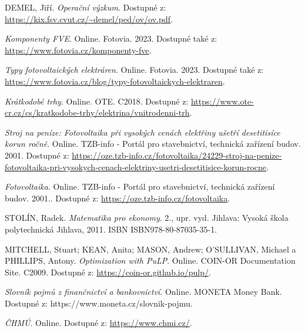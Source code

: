 \begin{thebibliography}{9}
    DEMEL, Jiří. \textit{Operační výzkum}. Dostupné z: \url{https://kix.fsv.cvut.cz/~demel/ped/ov/ov.pdf}.
    
    \textit{Komponenty FVE}. Online. Fotovia. 2023. Dostupné také z: \url{https://www.fotovia.cz/komponenty-fve}.
    
    \textit{Typy fotovoltaických elektráren}. Online. Fotovia. 2023. Dostupné také z: \url{https://www.fotovia.cz/blog/typy-fotovoltaickych-elektraren}.
    
    \textit{Krátkodobé trhy}. Online. OTE. C2018. Dostupné z: \url{https://www.ote-cr.cz/cs/kratkodobe-trhy/elektrina/vnitrodenni-trh}.
    
    \textit{Stroj na peníze: Fotovoltaika při vysokých cenách elektřiny ušetří desetitisíce korun ročně}. Online. TZB-info - Portál pro stavebnictví, technická zařízení budov. 2001. Dostupné z: \url{https://oze.tzb-info.cz/fotovoltaika/24229-stroj-na-penize-fotovoltaika-pri-vysokych-cenach-elektriny-usetri-desetitisice-korun-rocne}.

    \textit{Fotovoltaika}. Online. TZB-info - Portál pro stavebnictví, technická zařízení budov. 2001.. Dostupné z: \url{https://oze.tzb-info.cz/fotovoltaika}.

    STOLÍN, Radek. \textit{Matematika pro ekonomy}. 2., upr. vyd. Jihlava: Vysoká škola polytechnická Jihlava, 2011. ISBN ISBN978-80-87035-35-1.

    MITCHELL, Stuart; KEAN, Anita; MASON, Andrew; O'SULLIVAN, Michael a PHILLIPS, Antony. \textit{Optimization with PuLP}. Online. COIN-OR Documentation Site. C2009. Dostupné z: \url{https://coin-or.github.io/pulp/}.
    
    \textit{Slovník pojmů z finančnictví a bankovnictví}. Online. MONETA Money Bank. Dostupné z: https://www.moneta.cz/slovnik-pojmu.

    \textit{ČHMÚ}. Online. Dostupné z: \url{https://www.chmi.cz/}.

\end{thebibliography}